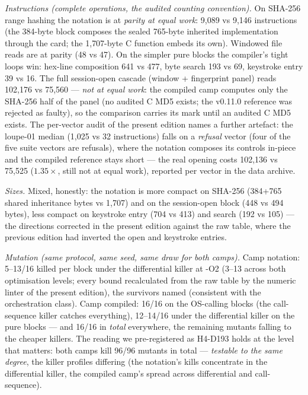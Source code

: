 \documentclass[11pt,a4paper]{article}
\begin{document}
\emph{Instructions (complete operations, the audited counting convention).}
On SHA-256 range hashing the notation is at \emph{parity at equal work}:
9{,}089 vs 9{,}146 instructions (the 384-byte block composes the sealed
765-byte inherited implementation through the card; the 1{,}707-byte C
function embeds its own). Windowed file reads are at parity (48 vs 47). On
the simpler pure blocks the compiler's tight loops win: hex-line
composition 641 vs 477, byte search 193 vs 69, keystroke entry 39 vs 16.
The full session-open cascade (window + fingerprint panel) reads
102{,}176 vs 75{,}560 --- \emph{not at equal work}: the compiled camp
computes only the SHA-256 half of the panel (no audited C MD5 exists;
the v0.11.0 reference was rejected as faulty), so the comparison
carries its mark until an audited C MD5 exists. The per-vector audit
of the present edition names a further artefact: the loupe-01 median
(1{,}025 vs 32 instructions) falls on a \emph{refusal} vector (four
of the five suite vectors are refusals), where the notation composes
its controls in-piece and the compiled reference stays short --- the
real opening costs 102{,}136 vs 75{,}525 ($1.35\times$, still not at
equal work), reported per vector in the data archive.

\emph{Sizes.} Mixed, honestly: the notation is more compact on
SHA-256 (384+765 shared inheritance bytes vs 1{,}707) and on the
session-open block (448 vs 494 bytes), less compact on keystroke
entry (704 vs 413) and search (192 vs 105) --- the directions
corrected in the present edition against the raw table, where the
previous edition had inverted the open and keystroke entries.

\emph{Mutation (same protocol, same seed, same draw for both camps).}
Camp notation: 5--13/16 killed per block under the differential
killer at -O2 (3--13 across both optimisation levels; every bound
recalculated from the raw table by the numeric linter of the present
edition), the survivors named (consistent with the orchestration
class). Camp compiled: 16/16 on the OS-calling blocks (the call-
sequence killer catches everything), 12--14/16 under the differential
killer on the pure blocks --- and 16/16 in \emph{total} everywhere,
the remaining mutants falling to the cheaper killers. The reading we
pre-registered as H4-D193 holds at the level that matters: both camps
kill 96/96 mutants in total --- \emph{testable to the same degree},
the killer profiles differing (the notation's kills concentrate in
the differential killer, the compiled camp's spread across
differential and call-sequence).
\end{document}
